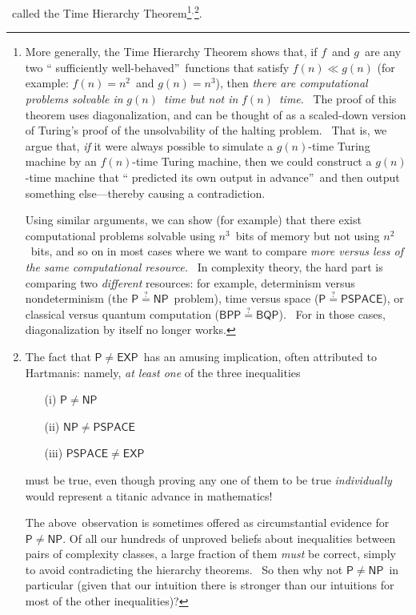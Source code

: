 \documentclass[11pt,onecolumn]{article}%
\begin{document}
\cite{hs}\ called the Time Hierarchy Theorem\footnote{More generally, the Time
Hierarchy Theorem shows that, if $f$\ and $g$\ are any two \textquotedblleft
sufficiently well-behaved\textquotedblright\ functions that satisfy $f\left(
n\right)  \ll g\left(  n\right)  $ (for example: $f\left(  n\right)  =n^{2}%
$\ and $g\left(  n\right)  =n^{3}$), then \textit{there are computational
problems solvable in }$g\left(  n\right)  $\textit{\ time but not in
}$f\left(  n\right)  $\textit{\ time}. \ The proof of this theorem uses
diagonalization, and can be thought of as a scaled-down version of Turing's
proof of the unsolvability of the halting problem. \ That is, we argue that,
\textit{if} it were always possible to simulate a $g\left(  n\right)  $-time
Turing machine by an $f\left(  n\right)  $-time Turing machine, then we could
construct a $g\left(  n\right)  $-time machine that \textquotedblleft
predicted its own output in advance\textquotedblright\ and then output
something else---thereby causing a contradiction.
\par
Using similar arguments, we can show (for example) that there exist
computational problems solvable using $n^{3}$\ bits of memory but not using
$n^{2}$\ bits, and so on in most cases where we want to compare \textit{more
versus less of the same computational resource.} \ In complexity theory, the
hard part is comparing two \textit{different} resources: for example,
determinism versus nondeterminism (the $\mathsf{P}\overset{?}{=}\mathsf{NP}%
$\ problem), time versus space ($\mathsf{P\overset{?}{=}PSPACE}$), or
classical versus quantum computation ($\mathsf{BPP\overset{?}{=}BQP}$). \ For
in those cases, diagonalization by itself no longer works.}$^{,}$\footnote{The
fact that $\mathsf{P}\neq\mathsf{EXP}$\ has an amusing implication, often
attributed to Hartmanis: namely, \textit{at least one} of the three
inequalities
\par
\begin{enumerate}
\item[(i)] $\mathsf{P}\neq\mathsf{NP}$
\par
\item[(ii)] $\mathsf{NP}\neq\mathsf{PSPACE}$
\par
\item[(iii)] $\mathsf{PSPACE}\neq\mathsf{EXP}$
\end{enumerate}
\par
\noindent must be true, even though proving any one of them to be true
\textit{individually} would represent a titanic advance in mathematics!
\par
The above\ observation is sometimes offered as circumstantial evidence for
$\mathsf{P}\neq\mathsf{NP}$. Of all our hundreds of unproved beliefs about
inequalities between pairs of complexity classes, a large fraction of them
\textit{must} be correct, simply to avoid contradicting the hierarchy
theorems. \ So then why not $\mathsf{P}\neq\mathsf{NP}$\ in particular (given
that our intuition there is stronger than our intuitions for most of the other
inequalities)?}.
\end{document}
